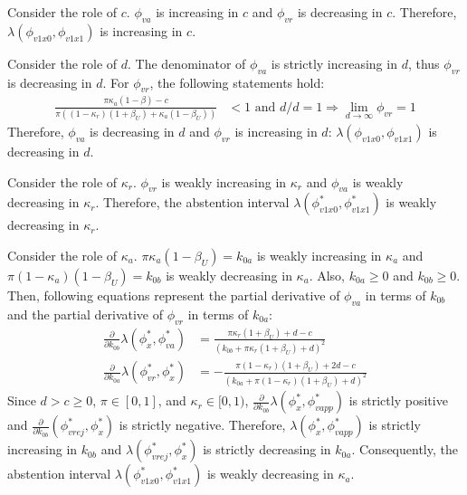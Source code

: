 \par Consider the role of $c$. $\phi_{va}$ is increasing in $c$ and $\phi_{vr}$ is decreasing in $c$. Therefore, $\lambda(\phi_{v1x0},\phi_{v1x1})$ is increasing in $c$. 

\par Consider the role of $d$. The denominator of $\phi_{va}$ is strictly increasing in $d$, thus $\phi_{vr}$ is decreasing in $d$. For $\phi_{vr}$, the following statements hold:
\begin{align*}
\frac{\pi \kappa_{a} (1-\beta) - c}{\pi ( (1-\kappa_{r}) (1+\beta_U) + \kappa_{a} (1-\beta_U))} &< 1 \text{ and } d/d = 1 \Rightarrow \lim_{d \to \infty} \phi_{vr} = 1 
\end{align*}
\noindent Therefore, $\phi_{va}$ is decreasing in $d$ and $\phi_{vr}$ is increasing in $d$: $\lambda(\phi_{v1x0},\phi_{v1x1})$ is decreasing in $d$.

\par Consider the role of $\kappa_{r}$. $\phi_{vr}$ is weakly increasing in $\kappa_{r}$ and $\phi_{va}$ is weakly decreasing in $\kappa_{r}$. Therefore, the abstention interval $\lambda (\phi^*_{v1x0}, \phi^*_{v1x1})$ is weakly decreasing in $\kappa_{r}$. 

\par Consider the role of $\kappa_{a}$. $\pi \kappa_{a} (1-\beta_U)= k_{0a}$ is weakly increasing in  $\kappa_{a}$  and $\pi (1-\kappa_{a}) (1-\beta_U) = k_{0b}$ is weakly decreasing in $\kappa_{a}$. Also, $k_{0a} \geq 0$ and $k_{0b} \geq 0$. Then, following equations represent the partial derivative of $\phi_{va}$ in terms of $k_{0b}$ and the partial derivative of $\phi_{vr}$ in terms of $k_{0a}$:
\begin{align*}
\frac{\partial}{\partial k_{0b}} \lambda (\phi^*_x, \phi^*_{va}) &= \frac{  \pi \kappa_{r}(1+\beta_U) + d - c}{(k_{0b} + \pi \kappa_{r}(1+\beta_U) + d)^2} \\
\frac{\partial}{\partial k_{0a}} \lambda (\phi^*_{vr}, \phi^*_x) &=  - \frac{\pi (1-\kappa_{r}) (1 + \beta_U) + 2 d - c}{(k_{0a} + \pi (1-\kappa_{r}) (1+\beta_U) + d)^2} 
\end{align*}
\noindent Since $d > c \geq 0$, $\pi \in [0,1]$, and $\kappa_{r} \in [0,1)$, $\frac{\partial}{\partial k_{0b}} \lambda (\phi^*_x, \phi^*_{vapp}) $ is strictly positive and $ \frac{\partial}{\partial k_{0b}} (\phi^*_{vrej}, \phi^*_x)$ is strictly negative. Therefore, $\lambda (\phi^*_x, \phi^*_{vapp})$ is strictly increasing in $k_{0b}$ and $\lambda (\phi^*_{vrej}, \phi^*_x)$ is strictly decreasing in $k_{0a}$. Consequently, the abstention interval $\lambda (\phi^*_{v1x0}, \phi^*_{v1x1})$ is weakly decreasing in $\kappa_{a}$. 


